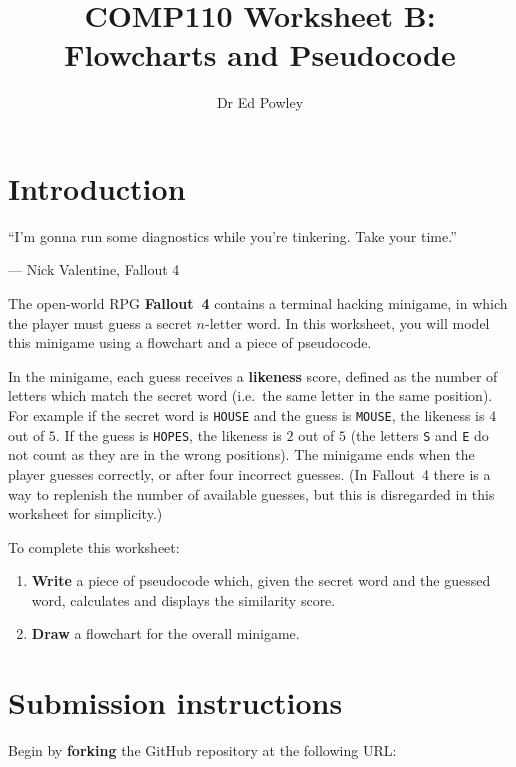 \documentclass{../../../fal_assignment}
\title{COMP110 Worksheet B: Flowcharts and Pseudocode}
\author{Dr Ed Powley}
\begin{document}
\maketitle

\section*{Introduction}

\begin{marginquote}
``I'm gonna run some diagnostics while you're tinkering. Take your time.''

--- Nick Valentine, Fallout 4
\end{marginquote}

The open-world RPG \textbf{Fallout~4} contains a terminal hacking minigame, in which
the player must guess a secret $n$-letter word.
In this worksheet, you will model this minigame using a flowchart and a piece of pseudocode.

In the minigame, each guess receives a \textbf{likeness} score,
defined as the number of letters which match the secret word (i.e.\ the same letter in the same position).
For example if the secret word is \texttt{HOUSE} and the guess is \texttt{MOUSE}, the likeness is $4$ out of $5$.
If the guess is \texttt{HOPES}, the likeness is $2$ out of $5$
(the letters \texttt{S} and \texttt{E} do not count as they are in the wrong positions).
The minigame ends when the player guesses correctly, or after four incorrect guesses.
(In Fallout~4 there is a way to replenish the number of available guesses,
but this is disregarded in this worksheet for simplicity.)

To complete this worksheet:
\begin{enumerate}[label=(\alph*)]
	\item \textbf{Write} a piece of pseudocode which, given the secret word and the guessed word,
		calculates and displays the similarity score.
	\item \textbf{Draw} a flowchart for the overall minigame.
\end{enumerate}

\section*{Submission instructions}

Begin by \textbf{forking} the GitHub repository at the following URL:
\end{document}
